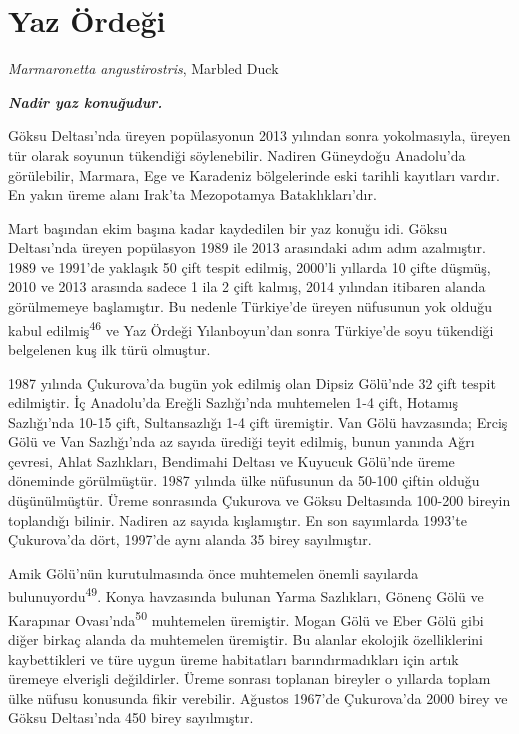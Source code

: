 \documentclass[
  letterpaper,
  DIV=11,
  numbers=noendperiod]{scrreprt}
\begin{document}
\hypertarget{yaz-uxf6rdeux11fi}{%
\section{Yaz Ördeği}\label{yaz-uxf6rdeux11fi}}

\emph{Marmaronetta angustirostris}, Marbled Duck

\textbf{\emph{Nadir yaz konuğudur.}}

Göksu Deltası'nda üreyen popülasyonun 2013 yılından sonra yokolmasıyla,
üreyen tür olarak soyunun tükendiği söylenebilir. Nadiren Güneydoğu
Anadolu'da görülebilir, Marmara, Ege ve Karadeniz bölgelerinde eski
tarihli kayıtları vardır. En yakın üreme alanı Irak'ta Mezopotamya
Bataklıkları'dır.

Mart başından ekim başına kadar kaydedilen bir yaz konuğu idi. Göksu
Deltası'nda üreyen popülasyon 1989 ile 2013 arasındaki adım adım
azalmıştır. 1989 ve 1991'de yaklaşık 50 çift tespit edilmiş, 2000'li
yıllarda 10 çifte düşmüş, 2010 ve 2013 arasında sadece 1 ila 2 çift
kalmış, 2014 yılından itibaren alanda görülmemeye başlamıştır. Bu
nedenle Türkiye'de üreyen nüfusunun yok olduğu kabul
edilmiş\textsuperscript{46} ve Yaz Ördeği Yılanboyun'dan sonra
Türkiye'de soyu tükendiği belgelenen kuş ilk türü olmuştur.

1987 yılında Çukurova'da bugün yok edilmiş olan Dipsiz Gölü'nde 32 çift
tespit edilmiştir. İç Anadolu'da Ereğli Sazlığı'nda muhtemelen 1-4 çift,
Hotamış Sazlığı'nda 10-15 çift, Sultansazlığı 1-4 çift üremiştir. Van
Gölü havzasında; Erciş Gölü ve Van Sazlığı'nda az sayıda ürediği teyit
edilmiş, bunun yanında Ağrı çevresi, Ahlat Sazlıkları, Bendimahi Deltası
ve Kuyucuk Gölü'nde üreme döneminde görülmüştür. 1987 yılında ülke
nüfusunun da 50-100 çiftin olduğu düşünülmüştür. Üreme sonrasında
Çukurova ve Göksu Deltasında 100-200 bireyin toplandığı bilinir. Nadiren
az sayıda kışlamıştır. En son sayımlarda 1993'te Çukurova'da dört,
1997'de aynı alanda 35 birey sayılmıştır.

Amik Gölü'nün kurutulmasında önce muhtemelen önemli sayılarda
bulunuyordu\textsuperscript{49}. Konya havzasında bulunan Yarma
Sazlıkları, Gönenç Gölü ve Karapınar Ovası'nda\textsuperscript{50}
muhtemelen üremiştir. Mogan Gölü ve Eber Gölü gibi diğer birkaç alanda
da muhtemelen üremiştir. Bu alanlar ekolojik özelliklerini kaybettikleri
ve türe uygun üreme habitatları barındırmadıkları için artık üremeye
elverişli değildirler. Üreme sonrası toplanan bireyler o yıllarda toplam
ülke nüfusu konusunda fikir verebilir. Ağustos 1967'de Çukurova'da 2000
birey ve Göksu Deltası'nda 450 birey sayılmıştır.
\end{document}
